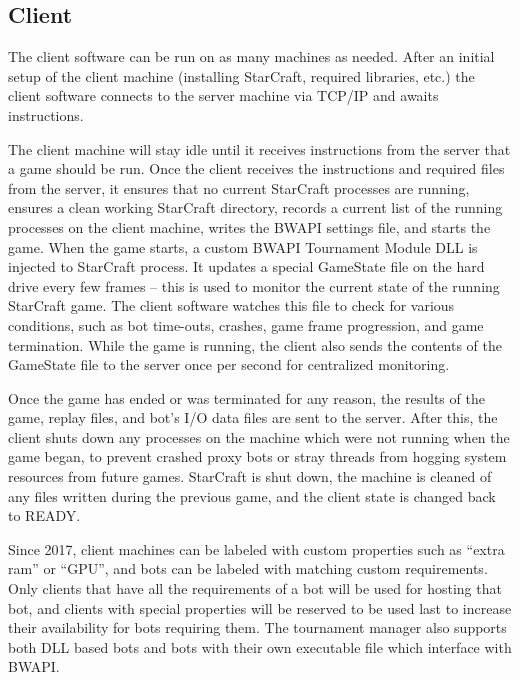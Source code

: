 \subsection{Client}

The client software can be run on as many machines as needed. After an initial setup of the client machine (installing StarCraft, required libraries, etc.) the client software connects to the server machine via TCP/IP and awaits instructions.

The client machine will stay idle until it receives instructions from the server that a game should be run. Once the client receives the instructions and required files from the server, it ensures that no current StarCraft processes are running, ensures a clean working StarCraft directory, records a current list of the running processes on the client machine, writes the BWAPI settings file, and starts the game. When the game starts, a custom BWAPI Tournament Module DLL is injected to StarCraft process. It updates a special GameState file on the hard drive every few frames -- this is used to monitor the current state of the running StarCraft game. The client software watches this file to check for various conditions, such as bot time-outs, crashes, game frame progression, and game termination. While the game is running, the client also sends the contents of the GameState file to the server once per second for centralized monitoring.

Once the game has ended or was terminated for any reason, the results of the game, replay files, and bot's I/O data files are sent to the server. After this, the client shuts down any processes on the machine which were not running when the game began, to prevent crashed proxy bots or stray threads from hogging system resources from future games. StarCraft is shut down, the machine is cleaned of any files written during the previous game, and the client state is changed back to READY.

Since 2017, client machines can be labeled with custom properties such as “extra ram” or “GPU”, and bots can be labeled with matching custom requirements. Only clients that have all the requirements of a bot will be used for hosting that bot, and clients with special properties will be reserved to be used last to increase their availability for bots requiring them. The tournament manager also supports both DLL based bots and bots with their own executable file which interface with BWAPI.
